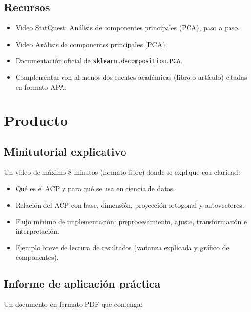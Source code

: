 \documentclass[a4,11pt]{aleph-notas}
\begin{document}
\subsection*{Recursos}
\begin{itemize}[leftmargin=*]
\item Video \href{https://youtu.be/FgakZw6K1QQ?si=a9cxs4ePio-H6MXm}{StatQuest: Análisis de componentes principales (PCA), paso a paso}.
\item Video \href{https://youtu.be/7My_PBhxeP4?si=zQf5Hr18NOb6cerX}{Análisis de componentes principales (PCA)}.
\item Documentación oficial de \href{https://scikit-learn.org/stable/modules/generated/sklearn.decomposition.PCA.html}{\texttt{sklearn.decomposition.PCA}}.
\item Complementar con al menos dos fuentes académicas (libro o artículo) citadas en formato APA.
\end{itemize}

\section{Producto}

\subsection{Minitutorial explicativo}
Un video de máximo 8 minutos (formato libre) donde se explique con claridad:
\begin{itemize}[leftmargin=*]
\item Qué es el ACP y para qué se usa en ciencia de datos.
\item Relación del ACP con base, dimensión, proyección ortogonal y autovectores.
\item Flujo mínimo de implementación: preprocesamiento, ajuste, transformación e interpretación.
\item Ejemplo breve de lectura de resultados (varianza explicada y gráfico de componentes).
\end{itemize}

\subsection{Informe de aplicación práctica}
Un documento en formato PDF que contenga:
\end{document}
